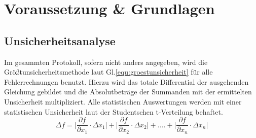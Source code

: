\section{Voraussetzung \& Grundlagen}
\label{sec:voraussetzungen-grundlagen}

\subsection{Unsicherheitsanalyse}
\label{sec:unsichi}
Im gesammten Protokoll, sofern nicht anders angegeben, wird die Größtunsicherheitsmethode laut Gl.\ref{equ:groestunsicherheit} \cite{MMETH} für alle Fehlerrechnungen benutzt.
Hierzu wird das totale Differential der ausgehenden Gleichung gebildet und die Absolutbeträge der Summanden mit der ermittelten Unsicherheit multipliziert.
Alle statistischen Auswertungen werden mit einer statistischen Unsicherheit laut der Studentschen t-Verteilung behaftet.
\begin{equation}
    \varDelta f = \biggl| \frac{\partial f}{\partial x_{1}} \cdot \varDelta x_{1} \biggl| + \biggl| \frac{\partial f}{\partial x_{2}} \cdot \varDelta x_{2} \biggl| + .... + \biggl| \frac{\partial f}{\partial x_{n}} \cdot \varDelta x_{n} \biggl|
    \label{equ:groestunsicherheit}
\end{equation}
\newpage